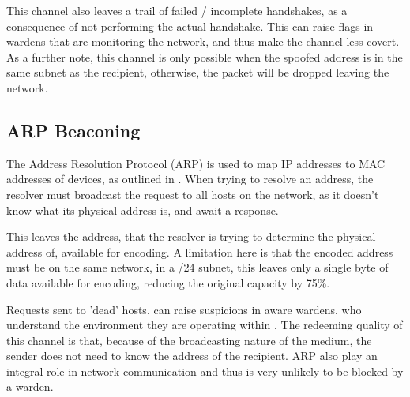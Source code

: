 This channel also leaves a trail of failed / incomplete handshakes, as a consequence of not performing the actual handshake. This can raise flags in wardens that are monitoring the network, and thus make the channel less covert. As a further note, this channel is only possible when the spoofed address is in the same subnet as the recipient, otherwise, the packet will be dropped leaving the network. 

\subsection{ARP Beaconing}
\label{sec:ARP}

The Address Resolution Protocol (ARP) is used to map IP addresses to MAC addresses of devices, as outlined in \cite{Arfc826}. When trying to resolve an address, the resolver must broadcast the request to all hosts on the network, as it doesn't know what its physical address is, and await a response.

This leaves the address, that the resolver is trying to determine the physical address of, available for encoding. A limitation here is that the encoded address must be on the same network, in a /24 subnet, this leaves only a single byte of data available for encoding, reducing the original capacity by 75\%.

Requests sent to 'dead' hosts, can raise suspicions in aware wardens, who understand the environment they are operating within \citep{CCUARP}. The redeeming quality of this channel is that, because of the broadcasting nature of the medium, the sender does not need to know the address of the recipient. ARP also play an integral role in network communication and thus is very unlikely to be blocked by a warden.
